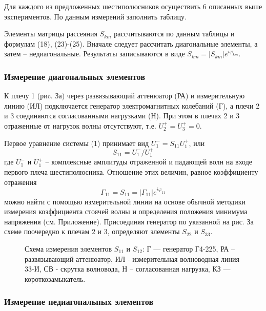 Для каждого из предложенных шестиполюсников осуществить 6 описанных выше экспериментов. По данным измерений заполнить таблицу.

Элементы матрицы рассеяния $S_{km}$ рассчитываются по данным таблицы и формулам (18), (23)-(25). Вначале следует рассчитать диагональные элементы, а затем -- недиагональные. Результаты записываются в виде $S _ { k m } = \left| S _ { k m } \right| e ^ { i \varphi _ { k m } }$.

\subsubsection{Измерение диагональных элементов}
К плечу 1 (риc. За) через развязывающий аттенюатор (РА) и измерительную линию (ИЛ) подключается генератор электромагнитных  колебаний (Г), а плечи 2 и 3 соединяются согласованными нагрузками (Н). 
При этом в плечах 2 и 3 отраженные от нагрузок волны отсутствуют, т.е. $U _ { 2 } ^ { + } = U _ { 3 } ^ { + } = 0$.


Первое уравнение системы (1) принимает вид $U_1^-=S_{11}U_1^+$, или
\begin{equation}
	S _ { 11 } = U _ { 1 } ^ { - } / U _ { 1 } ^ { + }
\end{equation}
где $U _ { 1 } ^ { - }$ и $U _ { 1 } ^ { + }$ -- комплексные амплитуды отраженной и падающей волн на входе первого плеча шестиполюсника. Отношение этих величин, равное коэффициенту отражения 
\begin{equation}
	\Gamma _ { 11 } = S _ { 11 } = \left| \Gamma _ { 11 } \right| e ^ { i \varphi _ { 11 } }
\end{equation}
можно найти с помощью измерительной линии на основе обычной методики измерения коэффициента стоячей волны и определения положения минимума напряжения (см. Приложение). 
Присоединяя генератор по указанной на рис. За схеме поочередно к плечам 2 и 3, определяют элементы $S_{22}$ и $S_{33}$.

\begin{figure}[h!]
	\centering
	\caption{Схема измерения элементов $S_{11}$ и $S_{12}$:  Г --- генератор Г4-225, РА  -- развязывающий аттенюатор, ИЛ - измерительная волноводная линия 33-И, СВ - скрутка волновода,  Н -- согласованная нагрузка, КЗ --- короткозамыкатель.}
	\label{fig:fig3}
\end{figure}



\subsubsection{Измерение недиагональных элементов}

